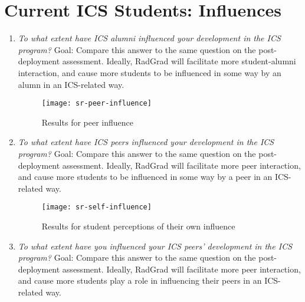 \section{Current ICS Students: Influences}
\begin{enumerate}
\begin{figure}[h]
\centering
\texttt{[image: sr-alumni-influence]}
\caption{Results for alumni influence}
\end{figure}
\item \textit{To what extent have ICS alumni influenced your development in the ICS program?}
Goal: Compare this answer to the same question on the post-deployment assessment. Ideally, RadGrad will facilitate more student-alumni interaction, and cause more students to be influenced in some way by an alumn in an ICS-related way.
\begin{figure}[h]
\centering
\texttt{[image: sr-peer-influence]}
\caption{Results for peer influence}
\end{figure}
\item \textit{To what extent have ICS peers influenced your development in the ICS program?}
Goal: Compare this answer to the same question on the post-deployment assessment. Ideally, RadGrad will facilitate more peer interaction, and cause more students to be influenced in some way by a peer in an ICS-related way.
\begin{figure}[h]
\centering
\texttt{[image: sr-self-influence]}
\caption{Results for student perceptions of their own influence}
\end{figure}
\item \textit{To what extent have you influenced your ICS peers’ development in the ICS program?}
Goal: Compare this answer to the same question on the post-deployment assessment. Ideally, RadGrad will facilitate more peer interaction, and cause more students play a role in influencing their peers in an ICS-related way.
\end{enumerate}

